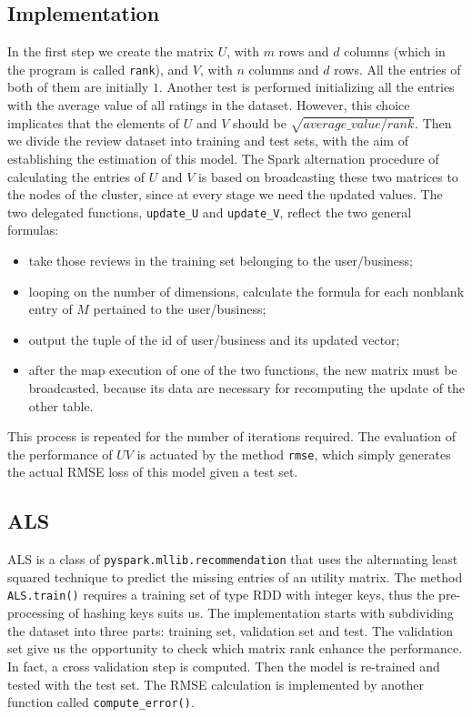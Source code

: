\documentclass{article}
\begin{document}
    \subsection{Implementation}
    In the first step we create the matrix $U$, with $m$ rows and $d$ columns (which in the program is called \texttt{rank}),  and $V$, with $n$ columns and $d$ rows. All the entries of both of them are initially $1$. Another test is performed initializing all the entries with the average value of all ratings in the dataset. However, this choice implicates that the elements of $U$ and $V$ should be $\sqrt{average\_value/rank}$. %
    Then we divide the review dataset into training and test sets, with the aim of establishing the estimation of this model. 
    The Spark alternation procedure of calculating the entries of $U$ and $V$ is based on broadcasting these two matrices to the nodes of the cluster, since at every stage we need the updated values. 
    The two delegated functions, \texttt{update\_U} and \texttt{update\_V}, reflect the two general formulas:
    \begin{itemize}
        \item take those reviews in the training set belonging to the user/business;
        \item looping on the number of dimensions, calculate the formula for each nonblank entry of $M$ pertained to the user/business;
        \item output the tuple of the id of user/business and its updated vector;
        \item after the map execution of one of the two functions, the new matrix must be broadcasted, because its data are necessary for recomputing the update of the other table. 
    \end{itemize}

    This process is repeated for the number of iterations required. The evaluation of the performance of $UV$ is actuated by the method \texttt{rmse}, which simply generates the actual RMSE loss of this model given a test set. 

\subsection{ALS}
ALS is a class of \texttt{pyspark.mllib.recommendation} \cite{als} that uses the alternating least squared technique \cite{ALS2} to predict the missing entries of an utility matrix. The method \texttt{ALS.train()} requires a training set of type RDD with integer keys, thus the pre-processing of hashing keys suits us. 
The implementation starts with subdividing the dataset into three parts: training set, validation set and test. The validation set give us the opportunity to check which matrix rank enhance the performance. In fact, a cross validation step is computed. Then the model is re-trained and tested with the test set. The RMSE calculation is implemented by another function called \texttt{compute\_error()}.
  
\end{document}
